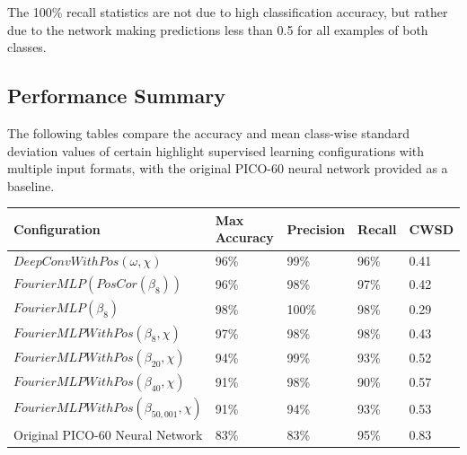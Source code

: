 \documentclass[10pt]{article}
\begin{document}
The 100\% recall statistics are not due to high classification accuracy, but rather due to the network making predictions less than 0.5 for all examples of both classes.

\subsection{Performance Summary}

The following tables compare the accuracy and mean class-wise standard deviation values of certain highlight supervised learning configurations with multiple input formats, with the original PICO-60 neural network provided as a baseline.

\begin{minipage}{\textwidth}
    \begin{center}
        \begin{tabular}{|l|l|l|l|l|}
            \hline
            Configuration & Max Accuracy & Precision & Recall & CWSD \\
            \hline
            $DeepConvWithPos(\omega, \chi)$ & 96\% & 99\% & 96\% & 0.41 \\
            \hline
            $FourierMLP(PosCor(\beta_{8}))$ & 96\% & 98\% & 97\% & 0.42 \\
            \hline
            $FourierMLP(\beta_{8})$ & 98\% & 100\% & 98\% & 0.29 \\
            \hline
            $FourierMLPWithPos(\beta_{8}, \chi)$ & 97\% & 98\% & 98\% & 0.43 \\
            \hline
            $FourierMLPWithPos(\beta_{20}, \chi)$ & 94\% & 99\% & 93\% & 0.52 \\
            \hline
            $FourierMLPWithPos(\beta_{40}, \chi)$ & 91\% & 98\% & 90\% & 0.57 \\
            \hline
            $FourierMLPWithPos(\beta_{50,001}, \chi)$ & 91\% & 94\% & 93\% & 0.53 \\
            \hline
            Original PICO-60 Neural Network & 83\% & 83\% & 95\% & 0.83 \\
            \hline
        \end{tabular}
    \end{center}
\end{minipage}
\end{document}
